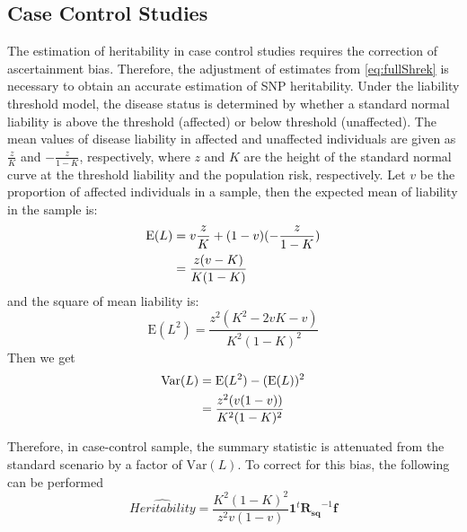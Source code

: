 		\subsection{Case Control Studies}	
			The estimation of heritability in case control studies requires the correction of ascertainment bias.
			Therefore, the adjustment of estimates from \cref{eq:fullShrek} is necessary to obtain an accurate estimation of \gls{SNP} heritability.
			Under the liability threshold model, the disease status is determined by whether a standard normal liability is above the threshold (affected) or below threshold (unaffected).
			The mean values of disease liability in affected and unaffected individuals are given as $\frac{z}{K}$ and $-\frac{z}{1-K}$, respectively, where $z$ and $K$ are the height of the standard normal curve at the threshold liability and the population risk, respectively.
			Let $v$ be the proportion of affected individuals in a sample, then the expected mean of liability in the sample is:
			\begin{align}
			\mathrm{E}(L)&=v\frac{z}{K}+(1-v)(-\frac{z}{1-K}) \notag\\
			&=\frac{z(v-K)}{K(1-K)}
			\end{align}
			and the square of mean liability is:
			\begin{equation}
			\mathrm{E}(L^2)=\frac{z^2(K^2-2vK-v)}{K^2(1-K)^2}
			\end{equation}
			Then we get
			\begin{align}
			\mathrm{Var}(L)&=\mathrm{E}(L^2)-(\mathrm{E}(L))^2 \notag\\
			&= \frac{z^2(v(1-v))}{K^2(1-K)^2}
			\end{align}
			
			Therefore, in case-control sample, the summary statistic is attenuated from the standard scenario by a factor of $\mathrm{Var}(L)$.
			To correct for this bias, the following can be performed
			\begin{equation}
			\hat{Heritability} =\frac{K^2(1-K)^2}{z^2v(1-v)} \boldsymbol{1}^t\boldsymbol{R_{sq}}^{-1}\boldsymbol{f}
			\label{eq:caseControlHerit}
			\end{equation}
			
